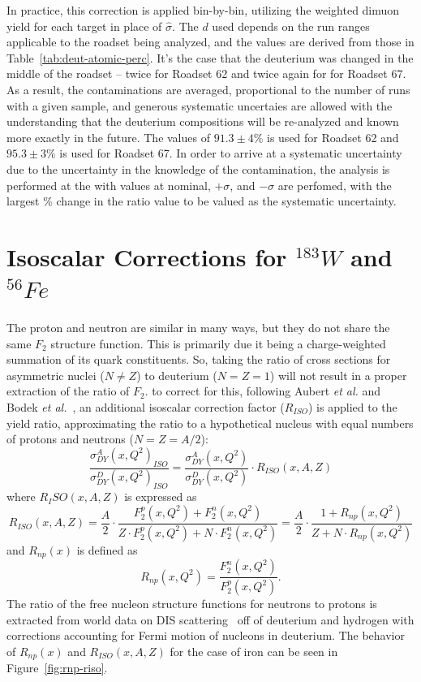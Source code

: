 In practice, this correction is applied bin-by-bin, utilizing the weighted dimuon yield for each target in place of $\hat{\sigma}$. The $d$ used depends on the run ranges applicable to the roadset being analyzed, and the values are derived from those in Table~\ref{tab:deut-atomic-perc}. It's the case that the deuterium was changed in the middle of the roadset -- twice for Roadset 62 and twice again for for Roadset 67. As a result, the contaminations are averaged, proportional to the number of runs with a given sample, and generous systematic uncertaies are allowed with the understanding that the deuterium compositions will be re-analyzed and known more exactly in the future. The values of $91.3\pm4\%$ is used for Roadset 62 and $95.3\pm3\%$ is used for Roadset 67. In order to arrive at a systematic uncertainty due to the uncertainty in the knowledge of the contamination, the analysis is performed at the with values at nominal, $+\sigma$, and $-\sigma$ are perfomed, with the largest \% change in the ratio value to be valued as the systematic uncertainty.

\section{\texorpdfstring{Isoscalar Corrections for $^{183}W$ and $^{56}Fe$}{Isoscalar Corrections for W-183 and Fe-56 }}

The proton and neutron are similar in many ways, but they do not share the same $F_2$ structure function. This is primarily due it being a charge-weighted summation of its quark constituents. So, taking the ratio of cross sections for asymmetric nuclei ($N\neq Z$) to deuterium ($N=Z=1$) will not result in a proper extraction of the ratio of $F_2$. to correct for this, following Aubert \emph{et al.} and Bodek \emph{et al.}~\cite{Aubert:1983xm, PhysRevLett.50.1431}, an additional isoscalar correction factor ($R_{ISO}$) is applied to the yield ratio, approximating the ratio to a hypothetical nucleus with equal numbers of protons and neutrons ($N=Z=A/2$):
\begin{equation}
\frac{\sigma^A_{DY}(x, Q^2)_{ISO}}{\sigma^D_{DY}(x, Q^2)_{ISO}} = \frac{\sigma^A_{DY}(x, Q^2)}{\sigma^D_{DY}(x, Q^2)} \cdot R_{ISO}(x, A, Z)
\end{equation}
where $R_ISO(x, A, Z)$ is expressed as
\begin{equation}
R_{ISO}(x, A, Z) = \frac{A}{2} \cdot \frac{F_2^p(x, Q^2) + F_2^n(x, Q^2)}{Z\cdot F_2^p(x, Q^2) + N\cdot F_2^n(x,Q^2)} = \frac{A}{2} \cdot \frac{1+R_{np}(x, Q^2)}{Z + N\cdot R_{np}(x, Q^2)}
\end{equation}
and $R_{np}(x)$ is defined as
\begin{equation}
R_{np}(x,Q^2) = \frac{F_2^n(x,Q^2)}{F_2^p(x,Q^2)}.
\end{equation}
The ratio of the free nucleon structure functions for neutrons to protons is extracted from world data on DIS scattering~\cite{Arrington:2008zh}  off of deuterium and hydrogen with corrections accounting for Fermi motion of nucleons in deuterium. The behavior of $R_{np}(x)$ and $R_{ISO}(x, A, Z)$ for the case of iron can be seen in Figure~\ref{fig:rnp-riso}.

